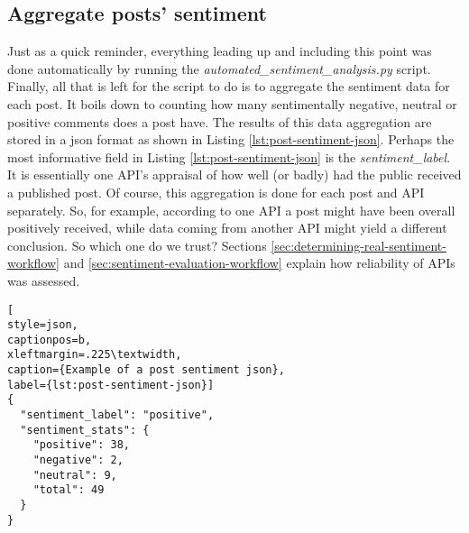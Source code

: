 \subsection*{Aggregate posts' sentiment \label{sec:aggregate-post-sentiment}}
Just as a quick reminder, everything leading up and including this point was done automatically by running the \textit{automated\_sentiment\_analysis.py} script.
Finally, all that is left for the script to do is to aggregate the sentiment data for each post. 
It boils down to counting how many sentimentally negative, neutral or positive comments does a post have. 
The results of this data aggregation are stored in a json format as shown in Listing \ref{lst:post-sentiment-json}. 
Perhaps the most informative field in Listing \ref{lst:post-sentiment-json} is the \emph{sentiment\_label}. It is essentially one API's appraisal of how well (or badly) had the public received a published post.
Of course, this aggregation is done for each post and API separately. So, for example, according to one API a post might have been overall positively received, while data coming from another API might yield a different conclusion. So which one do we trust? Sections \ref{sec:determining-real-sentiment-workflow}  and  \ref{sec:sentiment-evaluation-workflow} explain how reliability of APIs was assessed. 

\begin{lstlisting}[
style=json,
captionpos=b,
xleftmargin=.225\textwidth,
caption={Example of a post sentiment json},
label={lst:post-sentiment-json}]
{
  "sentiment_label": "positive", 
  "sentiment_stats": {
    "positive": 38, 
    "negative": 2,
    "neutral": 9, 
    "total": 49
  } 
}
\end{lstlisting}

